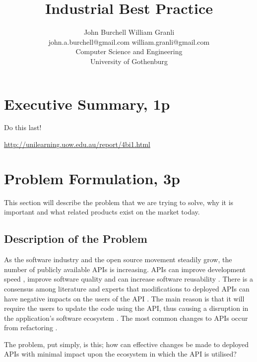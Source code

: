 \documentclass{article}
\title{Industrial Best Practice}
\begin{document}
\author{John Burchell \qquad William Granli \\
		john.a.burchell@gmail.com \qquad william.granli@gmail.com \\
		Computer Science and Engineering  \\
		University of Gothenburg }



\maketitle
\section{Executive Summary, 1p}
Do this last! 

\url{http://unilearning.uow.edu.au/report/4bi1.html}

\section{Problem Formulation, 3p}
This section will describe the problem that we are trying to solve, why it is important and what related products exist on the market today.

\subsection{Description of the Problem}

As the software industry and the open source movement steadily grow, the number of publicly available APIs is increasing. APIs can improve development speed \cite{stylos2006comparing}, improve software quality \cite{stylos2006comparing} and can increase software reusability \cite{afonso2012evaluating}. There is a consensus among literature and experts that modifications to deployed APIs can have negative impacts on the users of the API \cite{google_talk} \cite{mcdonnell2013empirical} \cite{robbes2012developers} \cite{henning2007api}. The main reason is that it will require the users to update the code using the API, thus causing a disruption in the application's software ecosystem \cite{messerschmitt2005software}. The most common changes to APIs occur from refactoring \cite{dig2005role} \cite{xing2006refactoring}.

The problem, put simply, is this; how can effective changes be made to deployed APIs with minimal impact upon the ecosystem in which the API is utilised?

\end{document}
